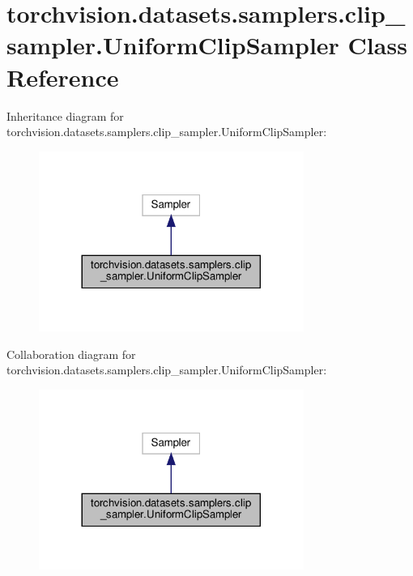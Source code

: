 \hypertarget{classtorchvision_1_1datasets_1_1samplers_1_1clip__sampler_1_1UniformClipSampler}{}\section{torchvision.\+datasets.\+samplers.\+clip\+\_\+sampler.\+Uniform\+Clip\+Sampler Class Reference}
\label{classtorchvision_1_1datasets_1_1samplers_1_1clip__sampler_1_1UniformClipSampler}


Inheritance diagram for torchvision.\+datasets.\+samplers.\+clip\+\_\+sampler.\+Uniform\+Clip\+Sampler\+:
\nopagebreak
\begin{figure}[H]
\begin{center}
\leavevmode
\includegraphics[width=245pt]{classtorchvision_1_1datasets_1_1samplers_1_1clip__sampler_1_1UniformClipSampler__inherit__graph}
\end{center}
\end{figure}


Collaboration diagram for torchvision.\+datasets.\+samplers.\+clip\+\_\+sampler.\+Uniform\+Clip\+Sampler\+:
\nopagebreak
\begin{figure}[H]
\begin{center}
\leavevmode
\includegraphics[width=245pt]{classtorchvision_1_1datasets_1_1samplers_1_1clip__sampler_1_1UniformClipSampler__coll__graph}
\end{center}
\end{figure}
